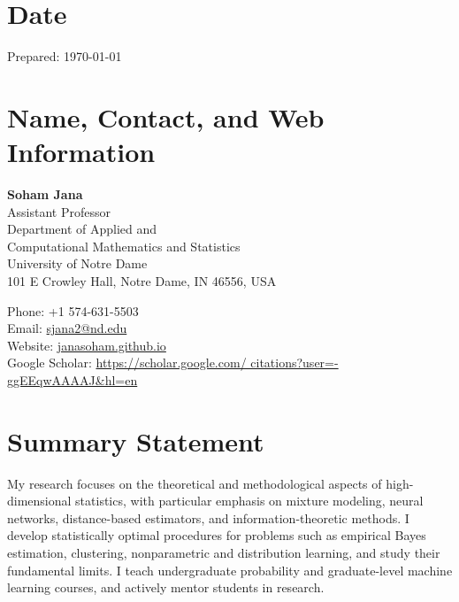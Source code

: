 \documentclass[letterpaper,oneside]{article}
\begin{document}
\section*{Date}

\noindent Prepared: \today

\section*{Name, Contact, and Web Information}

\noindent\begin{minipage}[t]{3.2in}
  \textbf{\Large Soham Jana}\\[0.3ex]
  Assistant Professor\\
  Department of Applied and \\ Computational Mathematics and Statistics\\
  University of Notre Dame\\
  101 E Crowley Hall, Notre Dame, IN 46556, USA
\end{minipage}
\hfill
\begin{minipage}[t]{3in}
  \raggedleft
  Phone: +1 574-631-5503\\
  Email: \href{mailto:sjana2@nd.edu}{sjana2@nd.edu}\\
  Website: \href{https://janasoham.github.io/}{janasoham.github.io}\\
  Google Scholar: \href{https://scholar.google.com/citations?hl=en&user=-ggEEqwAAAAJ}{https://scholar.google.com/
  	citations?user=-ggEEqwAAAAJ\&hl=en}
\end{minipage}

\section*{Summary Statement}

\noindent
My research focuses on the theoretical and methodological aspects of high-dimensional statistics, with particular emphasis on mixture modeling, neural networks, distance-based estimators, and information-theoretic methods. I develop statistically optimal procedures for problems such as empirical Bayes estimation, clustering, nonparametric and distribution learning, and study their fundamental limits. I teach undergraduate probability and graduate-level machine learning courses, and actively mentor students in research.
\end{document}
